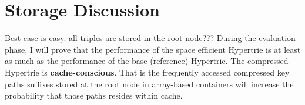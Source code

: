 \section{Storage Discussion}

Best case is easy. all triples are stored in the root node???
During the evaluation phase, I will prove that the performance of the space efficient Hypertrie is at least as much as the performance of the base (reference) Hypertrie. 
The compressed Hypertrie is \textbf{cache-conscious}. 
That is the frequently accessed compressed key paths suffixes stored at the root node in array-based containers will increase the probability that those paths resides within cache. 

